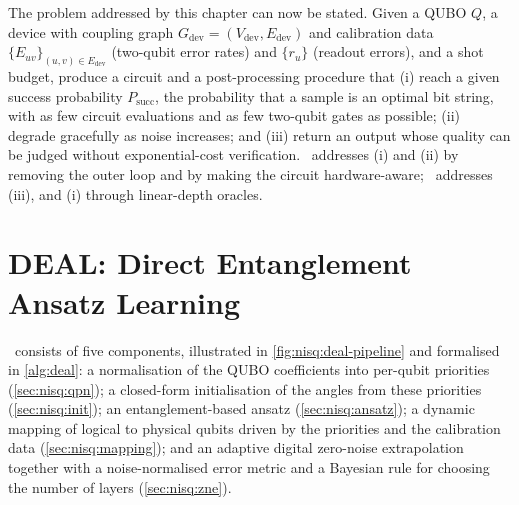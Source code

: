 The problem addressed by this chapter can now be stated. Given a QUBO $Q$, a device with coupling graph $G_{\mathrm{dev}}=(V_{\mathrm{dev}},E_{\mathrm{dev}})$ and calibration data $\{E_{uv}\}_{(u,v)\in E_{\mathrm{dev}}}$ (two-qubit error rates) and $\{r_{u}\}$ (readout errors), and a shot budget, produce a circuit and a post-processing procedure that (i) reach a given success probability $P_{\mathrm{succ}}$, the probability that a sample is an optimal bit string, with as few circuit evaluations and as few two-qubit gates as possible; (ii) degrade gracefully as noise increases; and (iii) return an output whose quality can be judged without exponential-cost verification. \deal\ addresses (i) and (ii) by removing the outer loop and by making the circuit hardware-aware; \qawa\ addresses (iii), and (i) through linear-depth oracles.

\section{DEAL: Direct Entanglement Ansatz Learning}\label{sec:nisq:deal}

\deal\ consists of five components, illustrated in \cref{fig:nisq:deal-pipeline} and formalised in \cref{alg:deal}: a normalisation of the QUBO coefficients into per-qubit priorities (\cref{sec:nisq:qpn}); a closed-form initialisation of the angles from these priorities (\cref{sec:nisq:init}); an entanglement-based ansatz (\cref{sec:nisq:ansatz}); a dynamic mapping of logical to physical qubits driven by the priorities and the calibration data (\cref{sec:nisq:mapping}); and an adaptive digital zero-noise extrapolation together with a noise-normalised error metric and a Bayesian rule for choosing the number of layers (\cref{sec:nisq:zne}).

